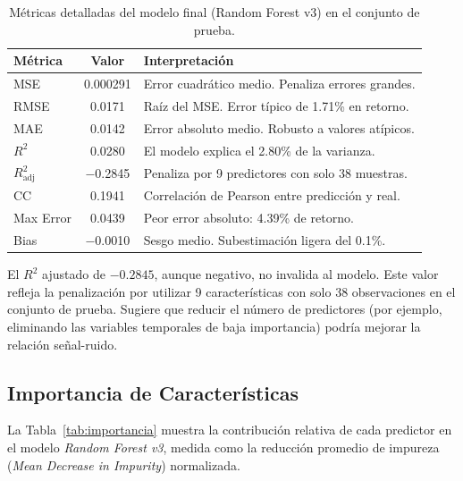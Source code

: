 \documentclass[12pt,a4paper]{article}
\begin{document}
\begin{table}[H]
\centering
\caption{Métricas detalladas del modelo final (Random Forest v3) en el conjunto de prueba.}
\label{tab:metricas_finales}
\small
\begin{tabular}{lcl}
\toprule
\textbf{Métrica} & \textbf{Valor} & \textbf{Interpretación} \\
\midrule
MSE          & 0.000291 & Error cuadrático medio. Penaliza errores grandes. \\
RMSE         & 0.0171   & Raíz del MSE. Error típico de 1.71\% en retorno. \\
MAE          & 0.0142   & Error absoluto medio. Robusto a valores atípicos. \\
$R^{2}$      & 0.0280   & El modelo explica el 2.80\% de la varianza. \\
$R^{2}_{\text{adj}}$ & $-$0.2845 & Penaliza por 9 predictores con solo 38 muestras. \\
CC           & 0.1941   & Correlación de Pearson entre predicción y real. \\
Max Error    & 0.0439   & Peor error absoluto: 4.39\% de retorno. \\
Bias         & $-$0.0010 & Sesgo medio. Subestimación ligera del 0.1\%. \\
\bottomrule
\end{tabular}
\end{table}

El $R^{2}$ ajustado de $-0.2845$, aunque negativo, no invalida al modelo. Este valor refleja la penalización por utilizar 9 características con solo 38 observaciones en el conjunto de prueba. Sugiere que reducir el número de predictores (por ejemplo, eliminando las variables temporales de baja importancia) podría mejorar la relación señal-ruido.

\subsection{Importancia de Características}

La Tabla~\ref{tab:importancia} muestra la contribución relativa de cada predictor en el modelo \textit{Random Forest v3}, medida como la reducción promedio de impureza (\textit{Mean Decrease in Impurity}) normalizada.
\end{document}
